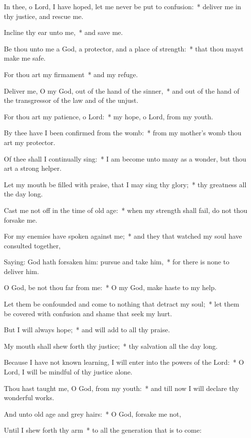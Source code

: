 \begin{enpars}
\item In thee, o Lord, I have hoped, let me never be put to confusion:~* deliver me in thy justice, and rescue me.
\item Incline thy ear unto me,~* and save me.
\item Be thou unto me a God, a protector, and a place of strength:~* that thou mayst make me safe.
\item For thou art my firmament~* and my refuge.
\item Deliver me, O my God, out of the hand of the sinner,~* and out of the hand of the transgressor of the law and of the unjust.
\item For thou art my patience, o Lord:~* my hope, o Lord, from my youth.
\item By thee have I been confirmed from the womb:~* from my mother’s womb thou art my protector.
\item Of thee shall I continually sing:~* I am become unto many as a wonder, but thou art a strong helper.
\item Let my mouth be filled with praise, that I may sing thy glory;~* thy greatness all the day long.
\item Cast me not off in the time of old age:~* when my strength shall fail, do not thou forsake me.
\item For my enemies have spoken against me;~* and they that watched my soul have consulted together,
\item Saying: God hath forsaken him: pursue and take him,~* for there is none to deliver him.
\item O God, be not thou far from me:~* O my God, make haste to my help.
\item Let them be confounded and come to nothing that detract my soul;~* let them be covered with confusion and shame that seek my hurt.
\item But I will always hope;~* and will add to all thy praise.
\item My mouth shall shew forth thy justice;~* thy salvation all the day long.
\item Because I have not known learning, I will enter into the powers of the Lord:~* O Lord, I will be mindful of thy justice alone.
\item Thou hast taught me, O God, from my youth:~* and till now I will declare thy wonderful works.
\item And unto old age and grey hairs:~* O God, forsake me not,
\item Until I shew forth thy arm~* to all the generation that is to come:

\end{enpars}
